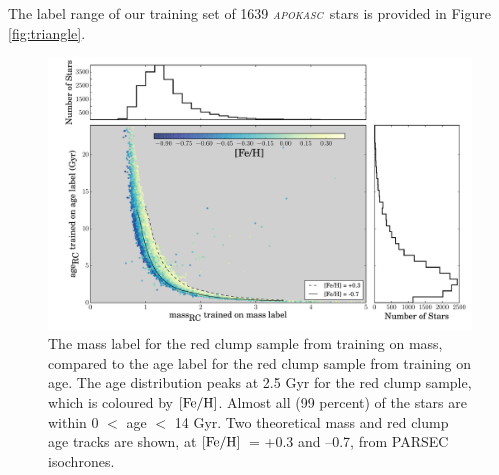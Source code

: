 \documentclass[12pt, preprint]{aastex}
\newcommand{\project}[1]{\textsl{#1}}
\newcommand{\apogee}{\project{\textsc{apogee}}}
\newcommand{\apokasc}{\project{\textsc{apokasc}}}
\newcommand{\feh}{\mbox{$\rm [Fe/H]$}}
\begin{document}
%


The label range of our training set of 1639 \apokasc\ stars is provided in Figure \ref{fig:triangle}. 


\begin{figure}[h!]
\centering
        \includegraphics[scale=0.4]{./plots/massage_hist2.pdf}
  \caption{The mass label for the red clump sample from training on mass, compared to the age label for the red clump sample from training on age. The age distribution peaks at 2.5 Gyr for the red clump sample, which is coloured by \feh. Almost all (99 percent) of the stars are within 0 $<$ age $<$ 14 Gyr. Two theoretical mass and red clump age tracks are shown, at \feh\ = +0.3 and --0.7, from PARSEC isochrones. }
\label{fig:agemass}
\end{figure}
\end{document}
